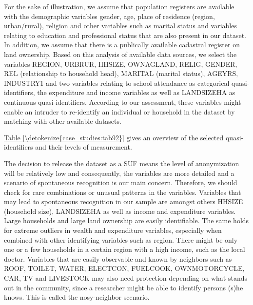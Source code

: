 \documentclass[letterpaper,10pt,english]{sphinxmanual}
\begin{document}
For the sake of illustration, we assume that population registers are
available with the demographic variables gender, age, place of residence
(region, urban/rural), religion and other variables such as marital
status and variables relating to education and professional status that
are also present in our dataset. In addition, we assume that there is a
publically available cadastral register on land ownership. Based on this
analysis of available data sources, we select the variables REGION,
URBRUR, HHSIZE, OWNAGLAND, RELIG, GENDER, REL (relationship to household
head), MARITAL (marital status), AGEYRS, INDUSTRY1 and two variables
relating to school attendance as categorical quasi-identifiers, the
expenditure and income variables as well as LANDSIZEHA as continuous
quasi-identifiers. According to our assessment, these variables might
enable an intruder to re-identify an individual or household in the
dataset by matching with other available datasets.

\hyperref[\detokenize{case_studies:tab92}]{Table \ref{\detokenize{case_studies:tab92}}} gives an overview of the selected quasi-identifiers and their
levels of measurement.

The decision to release the dataset as a SUF means the level of
anonymization will be relatively low and consequently, the variables are
more detailed and a scenario of spontaneous recognition is our main
concern. Therefore, we should check for rare combinations or unusual
patterns in the variables. Variables that may lead to spontaneous
recognition in our sample are amongst others HHSIZE (household size),
LANDSIZEHA as well as income and expenditure variables. Large households
and large land ownership are easily identifiable. The same holds for
extreme outliers in wealth and expenditure variables, especially when
combined with other identifying variables such as region. There might be
only one or a few households in a certain region with a high income,
such as the local doctor. Variables that are easily observable and known
by neighbors such as ROOF, TOILET, WATER, ELECTCON, FUELCOOK,
OWNMOTORCYCLE, CAR, TV and LIVESTOCK may also need protection depending
on what stands out in the community, since a researcher might be able to
identify persons (s)he knows. This is called the nosy-neighbor scenario.
\end{document}
